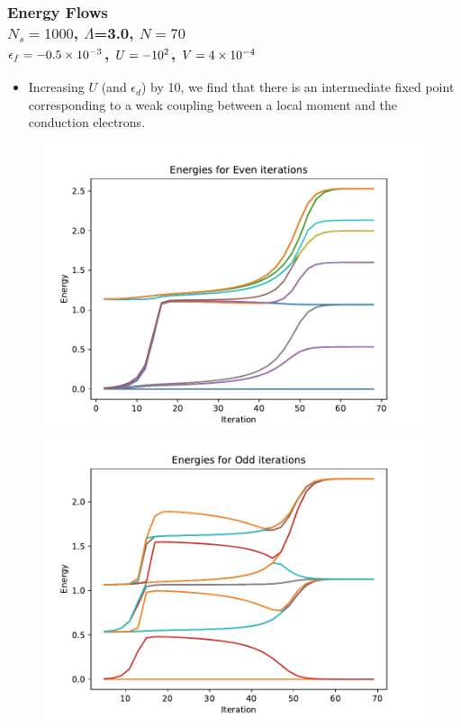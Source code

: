 \documentclass{beamer}
\begin{document}
\begin{frame}
  \frametitle{Energy Flows \\ $N_s=1000$, $\Lambda$=3.0, $N=70$ \\ $\epsilon_f=\num{-0.5d-3}$, $U=\num{-e2}$, $V=\num{4d-4}$}

  \begin{itemize}
  \item Increasing $U$ (and $\epsilon_d$) by 10, we find that there is an intermediate fixed point corresponding to a weak coupling between a local moment and the conduction electrons.
  \end{itemize}

  \begin{figure}
    \centering
    \includegraphics[width=0.49\linewidth]{./gfx/even.pdf}
    \includegraphics[width=0.49\linewidth]{./gfx/odd.pdf}
  \end{figure}
\end{frame}
\end{document}
